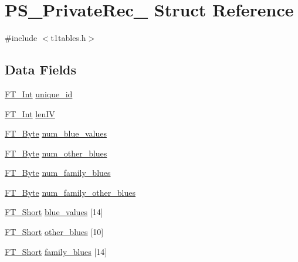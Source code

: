 \hypertarget{struct_p_s___private_rec__}{}\section{P\+S\+\_\+\+Private\+Rec\+\_\+ Struct Reference}
\label{struct_p_s___private_rec__}


{\ttfamily \#include $<$t1tables.\+h$>$}

\subsection*{Data Fields}
\begin{DoxyCompactItemize}
\item 
\hyperlink{fttypes_8h_af90e5fb0d07e21be9fe6faa33f02484c}{F\+T\+\_\+\+Int} \hyperlink{struct_p_s___private_rec___ae862c1db170cfee85aa3242be9fa5d57}{unique\+\_\+id}
\item 
\hyperlink{fttypes_8h_af90e5fb0d07e21be9fe6faa33f02484c}{F\+T\+\_\+\+Int} \hyperlink{struct_p_s___private_rec___a796ebb92d96f0297ae584a911768db8b}{len\+IV}
\item 
\hyperlink{fttypes_8h_a51f26183ca0c9f4af958939648caeccd}{F\+T\+\_\+\+Byte} \hyperlink{struct_p_s___private_rec___ae3c56e75b5674451a7296cbb9f0a2e40}{num\+\_\+blue\+\_\+values}
\item 
\hyperlink{fttypes_8h_a51f26183ca0c9f4af958939648caeccd}{F\+T\+\_\+\+Byte} \hyperlink{struct_p_s___private_rec___a149acdf871b0739f7ab13b1ac8e48a28}{num\+\_\+other\+\_\+blues}
\item 
\hyperlink{fttypes_8h_a51f26183ca0c9f4af958939648caeccd}{F\+T\+\_\+\+Byte} \hyperlink{struct_p_s___private_rec___a1e8a432c78f00034c73cfc54c787b10f}{num\+\_\+family\+\_\+blues}
\item 
\hyperlink{fttypes_8h_a51f26183ca0c9f4af958939648caeccd}{F\+T\+\_\+\+Byte} \hyperlink{struct_p_s___private_rec___a7370e2e89f39f7ff8923f3d1befbcfce}{num\+\_\+family\+\_\+other\+\_\+blues}
\item 
\hyperlink{fttypes_8h_aa7279be89046a2563cd3d4d6651fbdcf}{F\+T\+\_\+\+Short} \hyperlink{struct_p_s___private_rec___ae2c23ed06e54b680473f924483685425}{blue\+\_\+values} \mbox{[}14\mbox{]}
\item 
\hyperlink{fttypes_8h_aa7279be89046a2563cd3d4d6651fbdcf}{F\+T\+\_\+\+Short} \hyperlink{struct_p_s___private_rec___a6da97f89e174d621936c75fe9b463e65}{other\+\_\+blues} \mbox{[}10\mbox{]}
\item 
\hyperlink{fttypes_8h_aa7279be89046a2563cd3d4d6651fbdcf}{F\+T\+\_\+\+Short} \hyperlink{struct_p_s___private_rec___aa6645b5810e4e8b7d1a8b57300cdf406}{family\+\_\+blues} \mbox{[}14\mbox{]}

\end{DoxyCompactItemize}
